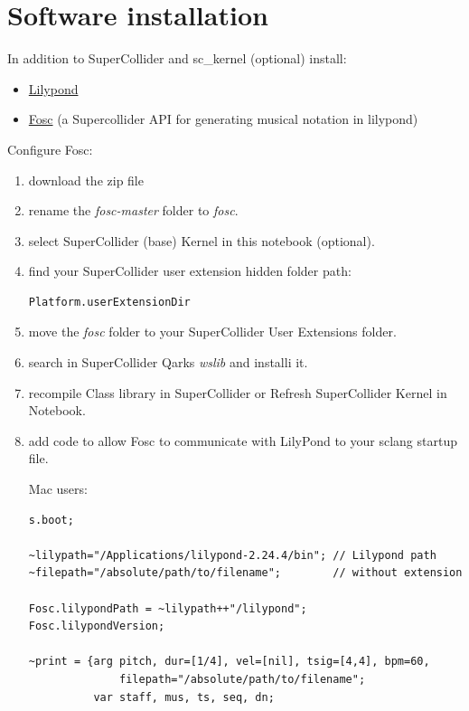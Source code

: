 \section{Software installation}\label{software-installation}

In addition to SuperCollider and sc\_kernel (optional) install: 

\begin{itemize}
\tightlist
\item \href{https://lilypond.org/}{Lilypond} 
\item \href{https://github.com/n-armstrong/fosc}{Fosc} (a Supercollider API for generating musical notation in lilypond)
\end{itemize}

Configure Fosc:

\begin{enumerate}
\def\labelenumi{\arabic{enumi}.}
\tightlist
\item download the zip file
\item rename the \textit{fosc-master} folder to \textit{fosc}.
\item select SuperCollider (base) Kernel in this notebook (optional).
\item find your SuperCollider user extension hidden folder path:

\begin{lstlisting}[frame=single] 
Platform.userExtensionDir
\end{lstlisting}

\item move the \textit{fosc} folder to your SuperCollider User Extensions folder.
\item search in SuperCollider Qarks \textit{wslib} and installi it.
\item recompile Class library in SuperCollider or Refresh SuperCollider Kernel in Notebook.
\item add code to allow Fosc to communicate with LilyPond to your sclang startup file.

\pagebreak

Mac users:

\begin{lstlisting}[frame=single] 
s.boot;

~lilypath="/Applications/lilypond-2.24.4/bin"; // Lilypond path
~filepath="/absolute/path/to/filename";        // without extension

Fosc.lilypondPath = ~lilypath++"/lilypond";
Fosc.lilypondVersion;

~print = {arg pitch, dur=[1/4], vel=[nil], tsig=[4,4], bpm=60, 
              filepath="/absolute/path/to/filename";
          var staff, mus, ts, seq, dn;
          

\end{lstlisting}
\end{enumerate}
